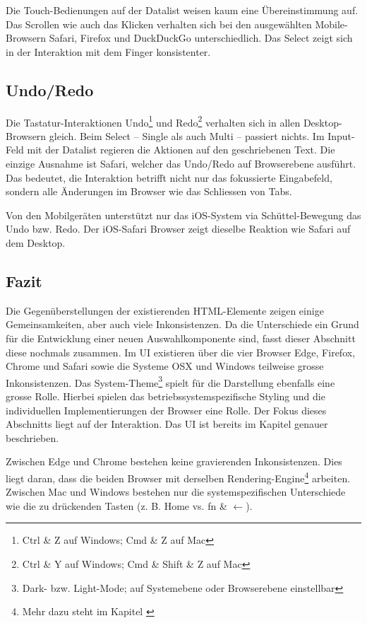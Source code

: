 Die Touch-Bedienungen auf der Datalist weisen kaum eine Übereinstimmung auf. 
Das Scrollen wie auch das Klicken verhalten sich bei den ausgewählten Mobile-Browsern Safari, Firefox und DuckDuckGo unterschiedlich. 
Das Select zeigt sich in der Interaktion mit dem Finger konsistenter. 


\subsection{Undo/Redo}
\label{sec:undoRedo}

Die Tastatur-Interaktionen Undo\footnote{
    Ctrl \& Z auf Windows; Cmd \& Z auf Mac
} und Redo\footnote{
    Ctrl \& Y auf Windows; Cmd \& Shift \& Z auf Mac
} verhalten sich in allen Desktop-Browsern gleich. 
Beim Select – Single als auch Multi – passiert nichts. 
Im Input-Feld mit der Datalist regieren die Aktionen auf den geschriebenen Text. 
Die einzige Ausnahme ist Safari, welcher das Undo/Redo auf Browserebene ausführt. 
Das bedeutet, die Interaktion betrifft nicht nur das fokussierte Eingabefeld, sondern alle Änderungen im Browser wie das Schliessen von Tabs. 

Von den Mobilgeräten unterstützt nur das iOS-System via Schüttel-Bewegung das Undo bzw. Redo. 
Der iOS-Safari Browser zeigt dieselbe Reaktion wie Safari auf dem Desktop. 


\clearpage
\subsection{Fazit}
\label{sec:summeryExisting}

Die Gegenüberstellungen der existierenden HTML-Elemente zeigen einige Gemeinsamkeiten, aber auch viele Inkonsistenzen. 
Da die Unterschiede ein Grund für die Entwicklung einer neuen Auswahlkomponente sind, fasst dieser Abschnitt diese nochmals zusammen. 
Im UI existieren über die vier Browser Edge, Firefox, Chrome und Safari sowie die Systeme OSX und Windows teilweise grosse Inkonsistenzen. 
Das System-Theme\footnote{
    Dark- bzw. Light-Mode; auf Systemebene oder Browserebene einstellbar
} spielt für die Darstellung ebenfalls eine grosse Rolle. 
Hierbei spielen das betriebssystemspezifische Styling und die individuellen Implementierungen der Browser eine Rolle. 
Der Fokus dieses Abschnitts liegt auf der Interaktion. 
Das UI ist bereits im Kapitel \textbf{} genauer beschrieben. 

Zwischen Edge und Chrome bestehen keine gravierenden Inkonsistenzen. 
Dies liegt daran, dass die beiden Browser mit derselben Rendering-Engine\footnote{
    Mehr dazu steht im Kapitel \textbf{}
} arbeiten. 
Zwischen Mac und Windows bestehen nur die systemspezifischen Unterschiede wie die zu drückenden Tasten (z. B. Home vs. fn \& $\leftarrow$). 


